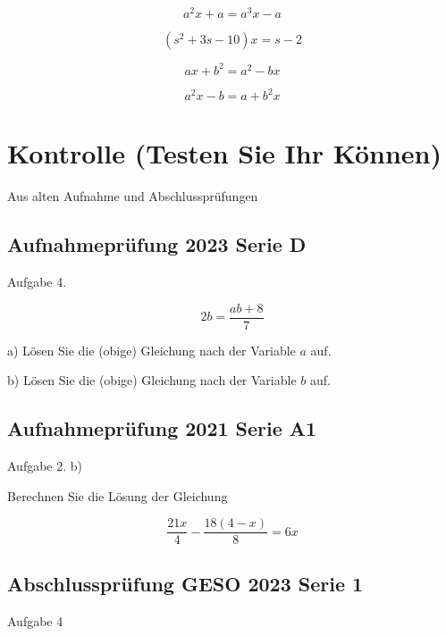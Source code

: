 {\begin{bbwAufgabenBlock}
\item $$a^2x+a = a^3x - a$$

\item $$(s^2 + 3s - 10)x = s-2$$

\item $$ax+b^2 = a^2 - bx$$

\item $$a^2x-b = a+b^2x$$
\end{bbwAufgabenBlock}
\newpage
\section{Kontrolle (Testen Sie Ihr Können)}

Aus alten Aufnahme und Abschlussprüfungen

\subsection{Aufnahmeprüfung 2023 Serie D}
Aufgabe 4.

$$2b = \frac{ab+8}{7}$$

a) Lösen Sie die (obige) Gleichung nach der Variable $a$ auf.


b) Lösen Sie die (obige) Gleichung nach der Variable $b$ auf.


\subsection{Aufnahmeprüfung 2021 Serie A1}
Aufgabe 2. b)

Berechnen Sie die Lösung der Gleichung

$$\frac{21x}{4} - \frac{18(4-x)}{8} = 6x$$


\subsection{Abschlussprüfung GESO 2023 Serie 1}
Aufgabe 4

}
